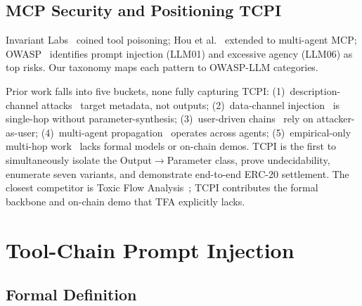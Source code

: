 \documentclass[conference]{IEEEtran}
\begin{document}
\subsection{MCP Security and Positioning TCPI}

Invariant Labs~\cite{invariantlabs2025mcp} coined tool poisoning; Hou et al.~\cite{hou2025mcp} extended to multi-agent MCP; OWASP~\cite{owasp2025llmtop10} identifies prompt injection (LLM01) and excessive agency (LLM06) as top risks.
Our taxonomy maps each pattern to OWASP-LLM categories.

Prior work falls into five buckets, none fully capturing TCPI:
(1)~description-channel attacks~\cite{invariantlabs2025mcp,shi2025toolhijacker} target metadata, not outputs;
(2)~data-channel injection~\cite{greshake2023injection} is single-hop without parameter-synthesis;
(3)~user-driven chains~\cite{lin2025stac} rely on attacker-as-user;
(4)~multi-agent propagation~\cite{lee2024infection} operates across agents;
(5)~empirical-only multi-hop work~\cite{agentarmor2025,invariantlabs2025tfa} lacks formal models or on-chain demos.
TCPI is the first to simultaneously isolate the Output$\to$Parameter class, prove undecidability, enumerate seven variants, and demonstrate end-to-end ERC-20 settlement.
The closest competitor is Toxic Flow Analysis~\cite{invariantlabs2025tfa}; TCPI contributes the formal backbone and on-chain demo that TFA explicitly lacks.


\section{Tool-Chain Prompt Injection}
\label{sec:tcpi}

\subsection{Formal Definition}
\label{sec:tcpi-def}
\end{document}
